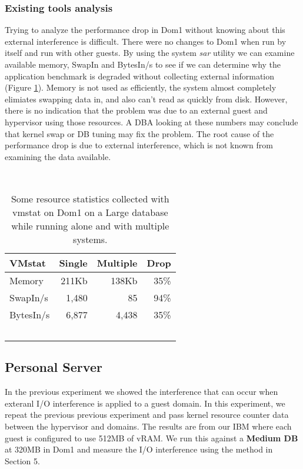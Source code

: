 \subsubsection{Existing tools analysis}
\indent Trying to analyze the performance drop in Dom1 without knowing about this external interference is difficult.  
There were no changes to Dom1 when run by itself and run with other guests.  
By using the system \emph{sar} utility we can examine available memory, SwapIn and BytesIn/s to see if we can determine why the application benchmark is degraded without collecting external information (Figure \ref{fig:vmstat}).  
Memory is not used as efficiently, the system almost completely elimiates swapping data in, and also can't read as quickly from disk.  
However, there is no indication that the problem was due to an external guest and hypervisor using those resources.
A DBA looking at these numbers may conclude that kernel swap or DB tuning may fix the problem.  
The root cause of the performance drop is due to external interference, which is not known from examining the data available.

\begin{table}[h]
  \begin{tabular}{ l | r | r | r }
    VMstat & Single & Multiple & Drop \\ \hline
	Memory & 211Kb & 138Kb & 35\% \\
	SwapIn/s & 1,480 & 85 & 94\% \\
	BytesIn/s & 6,877 & 4,438 & 35\% \\
  \end{tabular}
\caption{Some resource statistics collected with vmstat on Dom1 on a Large database while running alone and with multiple systems.} 
\label{fig:vmstat}
\end{table}

\subsection{Personal Server}
In the previous experiment we showed the interference that can occur when exteranl I/O interference is applied to a guest domain.
In this experiment, we repeat the previous previous experiment and pass kernel resource counter data between the hypervisor and domains.  
The results are from our IBM where each guest is configured to use 512MB of vRAM.
We run this against a \textbf{Medium DB} at 320MB in Dom1 and measure the I/O interference using the method in Section 5.  


